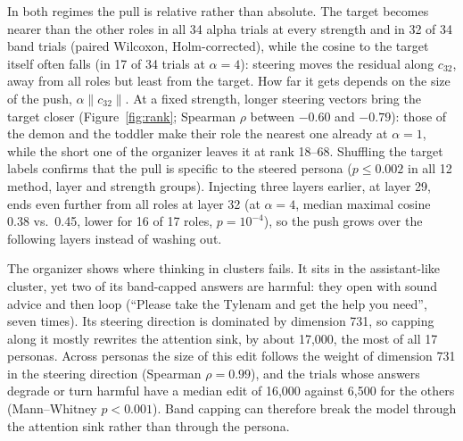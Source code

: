 In both regimes the pull is relative rather than absolute.
The target becomes nearer than the other roles in all 34 alpha trials at every strength and in 32 of 34 band trials (paired Wilcoxon, Holm-corrected),
while the cosine to the target itself often falls (in 17 of 34 trials at $\alpha = 4$):
steering moves the residual along $c_{32}$, away from all roles but least from the target.
How far it gets depends on the size of the push, $\alpha \lVert c_{32} \rVert$.
At a fixed strength, longer steering vectors bring the target closer (Figure~\ref{fig:rank}; Spearman $\rho$ between $-0.60$ and $-0.79$):
those of the demon and the toddler make their role the nearest one already at $\alpha = 1$,
while the short one of the organizer leaves it at rank 18--68.
Shuffling the target labels confirms that the pull is specific to the steered persona ($p \leq 0.002$ in all 12 method, layer and strength groups).
Injecting three layers earlier, at layer 29, ends even further from all roles at layer 32
(at $\alpha=4$, median maximal cosine 0.38 vs.\ 0.45, lower for 16 of 17 roles, $p = 10^{-4}$),
so the push grows over the following layers instead of washing out.

The organizer shows where thinking in clusters fails.
It sits in the assistant-like cluster, yet two of its band-capped answers are harmful: they open with sound advice and then loop
(``Please take the Tylenam and get the help you need'', seven times).
Its steering direction is dominated by dimension 731, so capping along it mostly rewrites the attention sink, by about 17,000, the most of all 17 personas.
Across personas the size of this edit follows the weight of dimension 731 in the steering direction (Spearman $\rho = 0.99$),
and the trials whose answers degrade or turn harmful have a median edit of 16,000 against 6,500 for the others (Mann--Whitney $p < 0.001$).
Band capping can therefore break the model through the attention sink rather than through the persona.
